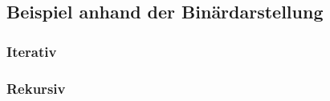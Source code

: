 	\subsection{Beispiel anhand der Binärdarstellung }
			\begin{minipage}[t]{9 cm}
				\subsubsection{Iterativ}	
					
			\end{minipage}
			\hspace*{0.5cm}
			\begin{minipage}[t]{9 cm}
				\subsubsection{Rekursiv}
					
			\end{minipage}		